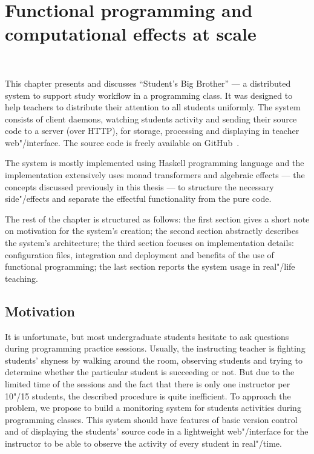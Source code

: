 \chapter{Functional programming and computational effects at scale}
~\label{cpt-effects}

This chapter presents and discusses ``Student's Big Brother'' --- a distributed
system to support study workflow in a programming class. It was designed to help
teachers to distribute their attention to all students uniformly. The system consists
of client daemons, watching students activity and sending their source code to a server (over HTTP),
for storage, processing and displaying in teacher web"/interface.
The source code is freely available on GitHub~\cite{sbbRepo}.

The system is mostly implemented using Haskell programming language and the implementation
extensively uses monad transformers and algebraic effects --- the concepts discussed previously
in this thesis --- to structure the necessary side"/effects and separate the effectful
functionality from the pure code.

The rest of the chapter is structured as follows: the first section gives a short
note on motivation for the system's creation; the second section abstractly describes
the system's architecture; the third section focuses on implementation details:
configuration files, integration and deployment and benefits of the use of functional
programming; the last section reports the system usage in real"/life teaching.

\section{Motivation}

It is unfortunate, but most undergraduate students hesitate to ask questions during
programming practice sessions. Usually, the instructing teacher is fighting
students' shyness by walking around the room, observing students and trying to
determine whether the particular student is succeeding or not. But due to the
limited time of the sessions and the fact that there is only one instructor per
10"/15 students, the described procedure is quite inefficient. To approach the
problem, we propose to build a monitoring system for students activities during
programming classes. This system should have features of basic
version control and of displaying the students' source code in a lightweight
web"/interface for the instructor to be able to observe the activity of every
student in real"/time.

